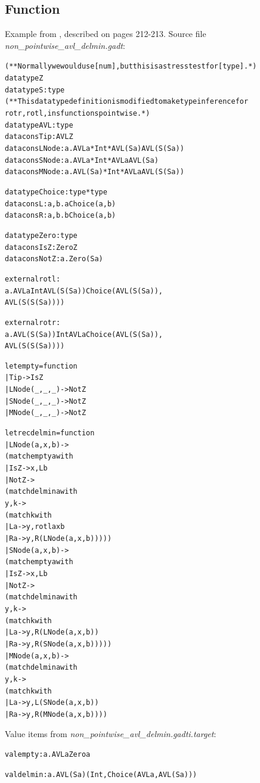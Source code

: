 \documentclass{article}
\newcommand{\tmem}[1]{{\em #1\/}}
\newcommand{\tmverbatim}[1]{{\ttfamily{#1}}}
\newenvironment{tmcode}[1][]{\begin{alltt}}{\end{alltt}}
\begin{document}
\subsection{Function \tmverbatim{delmin}}

Example from {\cite{PracticalGADTsInfer}}, described on pages 212-213. Source
file {\tmem{non\_pointwise\_avl\_delmin.gadt}}:
\begin{tmcode}
(** Normally we would use [num], but this is a stress test for [type]. *)
datatype Z
datatype S : type
(** This datatype definition is modified to make type inference for
    rotr, rotl, ins functions pointwise. *)
datatype AVL : type
datacons Tip : AVL Z
datacons LNode : a. AVL a * Int * AVL (S a)  AVL (S (S a))
datacons SNode : a. AVL a * Int * AVL a  AVL (S a)
datacons MNode : a. AVL (S a) * Int * AVL a  AVL (S (S a))

datatype Choice : type * type
datacons L : a, b. a  Choice (a, b)
datacons R : a, b. b  Choice (a, b)

datatype Zero : type
datacons IsZ : Zero Z
datacons NotZ : a. Zero (S a)

external rotl :
  a. AVL a  Int  AVL (S (S a))  Choice (AVL (S (S a)),
                                               AVL (S (S (S a))))

external rotr :
  a. AVL (S (S a))  Int  AVL a  Choice (AVL (S (S a)),
                                               AVL (S (S (S a))))

let empty = function
  | Tip -> IsZ
  | LNode (_, _, _) -> NotZ
  | SNode (_, _, _) -> NotZ
  | MNode (_, _, _) -> NotZ

let rec delmin = function
  | LNode (a, x, b) ->
    (match empty a with
      | IsZ -> x, L b
      | NotZ ->
        (match delmin a with
          y, k ->
          (match k with
            | L a -> y, rotl a x b
            | R a -> y, R (LNode (a, x, b)))))
  | SNode (a, x, b) ->
    (match empty a with
      | IsZ -> x, L b
      | NotZ ->
        (match delmin a with
          y, k ->
          (match k with
            | L a -> y, R (LNode (a, x, b))
            | R a -> y, R (SNode (a, x, b)))))
  | MNode (a, x, b) ->
    (match delmin a with
      y, k ->
      (match k with
        | L a -> y, L (SNode (a, x, b))
        | R a -> y, R (MNode (a, x, b))))
\end{tmcode}
Value items from {\tmem{non\_pointwise\_avl\_delmin.gadti.target}}:
\begin{tmcode}
val empty : a. AVL a  Zero a

val delmin : a. AVL (S a)  (Int, Choice (AVL a, AVL (S a)))
\end{tmcode}
\end{document}
